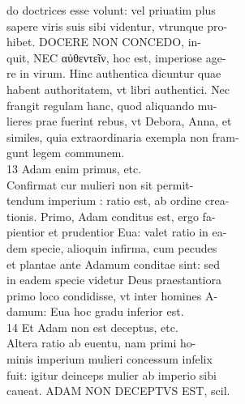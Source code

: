 \documentclass{article}
\begin{document}
\begin{pages}
                do doctrices esse volunt: vel priuatim plus \\
                sapere viris suis sibi videntur, vtrunque pro- \\
                hibet. DOCERE NON CONCEDO, in- \\
                quit, NEC αὐθεντεῖν, hoc est, imperiose age- \\
                re in virum. Hinc authentica dicuntur quae \\
                habent authoritatem, vt libri authentici. Nec \\
                frangit regulam hanc, quod aliquando mu- \\
                lieres prae fuerint rebus, vt Debora, Anna, et \\
                similes, quia extraordinaria exempla non fram- \\
                gunt legem communem. \\
                13 Adam enim primus, etc. \\
                Confirmat cur mulieri non sit permit- \\
                tendum imperium : ratio est, ab ordine crea- \\
                tionis. Primo, Adam conditus est, ergo fa- \\
                pientior et prudentior Eua: valet ratio in ea- \\
                dem specie, alioquin infirma, cum pecudes \\
                et plantae ante Adamum conditae sint: sed \\
                in eadem specie videtur Deus praestantiora \\
                primo loco condidisse, vt inter homines A- \\
                damum: Eua hoc gradu inferior est. \\
                14 Et Adam non est deceptus, etc. \\
                Altera ratio ab euentu, nam primi ho- \\
                minis imperium mulieri concessum infelix \\
                fuit: igitur deinceps mulier ab imperio sibi \\
                caueat. ADAM NON DECEPTVS EST, scil. \\

\end{pages}
\end{document}
